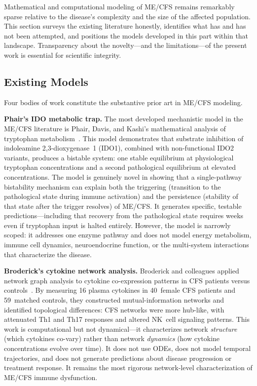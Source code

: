 Mathematical and computational modeling of ME/CFS remains remarkably sparse relative to the disease's complexity and the size of the affected population. This section surveys the existing literature honestly, identifies what has and has not been attempted, and positions the models developed in this part within that landscape. Transparency about the novelty---and the limitations---of the present work is essential for scientific integrity.

\subsection{Existing Models}
\label{sec:existing-models}

Four bodies of work constitute the substantive prior art in ME/CFS modeling.

\textbf{Phair's IDO metabolic trap.} The most developed mechanistic model in the ME/CFS literature is Phair, Davis, and Kashi's mathematical analysis of tryptophan metabolism~\cite{phair2019ido}. This model demonstrates that substrate inhibition of indoleamine 2,3-dioxygenase~1 (IDO1), combined with non-functional IDO2 variants, produces a bistable system: one stable equilibrium at physiological tryptophan concentrations and a second pathological equilibrium at elevated concentrations. The model is genuinely novel in showing that a single-pathway bistability mechanism can explain both the triggering (transition to the pathological state during immune activation) and the persistence (stability of that state after the trigger resolves) of ME/CFS. It generates specific, testable predictions---including that recovery from the pathological state requires weeks even if tryptophan input is halted entirely. However, the model is narrowly scoped: it addresses one enzyme pathway and does not model energy metabolism, immune cell dynamics, neuroendocrine function, or the multi-system interactions that characterize the disease.

\textbf{Broderick's cytokine network analysis.} Broderick and colleagues applied network graph analysis to cytokine co-expression patterns in CFS patients versus controls~\cite{broderick2010cytokine}. By measuring 16 plasma cytokines in 40~female CFS patients and 59~matched controls, they constructed mutual-information networks and identified topological differences: CFS networks were more hub-like, with attenuated Th1 and Th17 responses and altered NK~cell signaling patterns. This work is computational but not dynamical---it characterizes network \emph{structure} (which cytokines co-vary) rather than network \emph{dynamics} (how cytokine concentrations evolve over time). It does not use ODEs, does not model temporal trajectories, and does not generate predictions about disease progression or treatment response. It remains the most rigorous network-level characterization of ME/CFS immune dysfunction.

